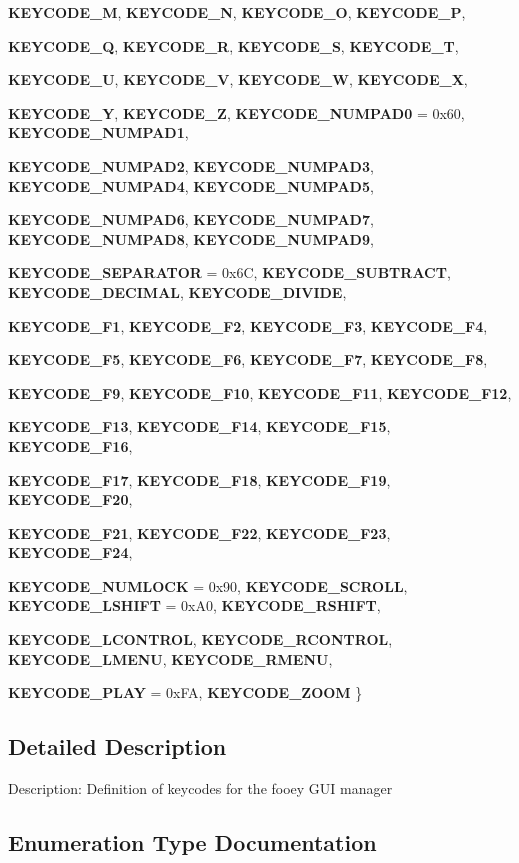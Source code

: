 \begin{DoxyCompactItemize}
{\bf KEYCODE\_\-M}, 
{\bf KEYCODE\_\-N}, 
{\bf KEYCODE\_\-O}, 
{\bf KEYCODE\_\-P}, 
\par
{\bf KEYCODE\_\-Q}, 
{\bf KEYCODE\_\-R}, 
{\bf KEYCODE\_\-S}, 
{\bf KEYCODE\_\-T}, 
\par
{\bf KEYCODE\_\-U}, 
{\bf KEYCODE\_\-V}, 
{\bf KEYCODE\_\-W}, 
{\bf KEYCODE\_\-X}, 
\par
{\bf KEYCODE\_\-Y}, 
{\bf KEYCODE\_\-Z}, 
{\bf KEYCODE\_\-NUMPAD0} =  0x60, 
{\bf KEYCODE\_\-NUMPAD1}, 
\par
{\bf KEYCODE\_\-NUMPAD2}, 
{\bf KEYCODE\_\-NUMPAD3}, 
{\bf KEYCODE\_\-NUMPAD4}, 
{\bf KEYCODE\_\-NUMPAD5}, 
\par
{\bf KEYCODE\_\-NUMPAD6}, 
{\bf KEYCODE\_\-NUMPAD7}, 
{\bf KEYCODE\_\-NUMPAD8}, 
{\bf KEYCODE\_\-NUMPAD9}, 
\par
{\bf KEYCODE\_\-SEPARATOR} =  0x6C, 
{\bf KEYCODE\_\-SUBTRACT}, 
{\bf KEYCODE\_\-DECIMAL}, 
{\bf KEYCODE\_\-DIVIDE}, 
\par
{\bf KEYCODE\_\-F1}, 
{\bf KEYCODE\_\-F2}, 
{\bf KEYCODE\_\-F3}, 
{\bf KEYCODE\_\-F4}, 
\par
{\bf KEYCODE\_\-F5}, 
{\bf KEYCODE\_\-F6}, 
{\bf KEYCODE\_\-F7}, 
{\bf KEYCODE\_\-F8}, 
\par
{\bf KEYCODE\_\-F9}, 
{\bf KEYCODE\_\-F10}, 
{\bf KEYCODE\_\-F11}, 
{\bf KEYCODE\_\-F12}, 
\par
{\bf KEYCODE\_\-F13}, 
{\bf KEYCODE\_\-F14}, 
{\bf KEYCODE\_\-F15}, 
{\bf KEYCODE\_\-F16}, 
\par
{\bf KEYCODE\_\-F17}, 
{\bf KEYCODE\_\-F18}, 
{\bf KEYCODE\_\-F19}, 
{\bf KEYCODE\_\-F20}, 
\par
{\bf KEYCODE\_\-F21}, 
{\bf KEYCODE\_\-F22}, 
{\bf KEYCODE\_\-F23}, 
{\bf KEYCODE\_\-F24}, 
\par
{\bf KEYCODE\_\-NUMLOCK} =  0x90, 
{\bf KEYCODE\_\-SCROLL}, 
{\bf KEYCODE\_\-LSHIFT} =  0xA0, 
{\bf KEYCODE\_\-RSHIFT}, 
\par
{\bf KEYCODE\_\-LCONTROL}, 
{\bf KEYCODE\_\-RCONTROL}, 
{\bf KEYCODE\_\-LMENU}, 
{\bf KEYCODE\_\-RMENU}, 
\par
{\bf KEYCODE\_\-PLAY} =  0xFA, 
{\bf KEYCODE\_\-ZOOM}
 \}
\end{DoxyCompactItemize}


\subsection{Detailed Description}
Description: Definition of keycodes for the fooey GUI manager 

\subsection{Enumeration Type Documentation}
